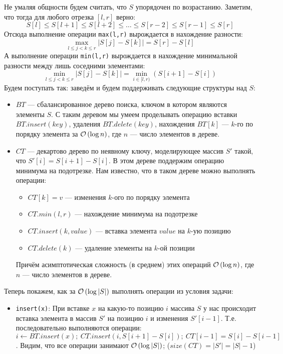 \begin{solution}
Не умаляя общности будем считать, что $S$ упорядочен по возрастанию.
Заметим, что тогда для любого отрезка $[l, r]$ верно:
\[
	S[l] \leqslant S[l + 1] \leqslant S[l + 2] \leqslant \ldots \leqslant S[r - 2] \leqslant S[r - 1] \leqslant S[r]
\]
Отсюда выполнение операции \texttt{max(l,r)} вырождается в нахождение разности:
\[
	\max_{l \leqslant j < k \leqslant r}{|S[j]-S[k]|} = S[r] - S[l]
\]
А выполнение операции \texttt{min(l,r)} вырождается в нахождение минимальной разности между лишь соседними элементами:
\[
	\min_{l \leqslant j < k \leqslant r}{|S[j]-S[k]|} = \min_{i \in [l, r)}{(S[i+1]-S[i])}
\]
Будем поступать так: заведём и будем поддерживать следующие структуры над $S$: 
\begin{itemize}
	\item $BT$ --- сбалансированное дерево поиска, ключом в котором являются элементы $S$. С таким деревом мы умеем проделывать операцию вставки $BT.insert(key)$, удаления $BT.delete(key)$, нахождения $BT[k]$ --- $k$-го по порядку элемента за $\mathcal{O}\left(\log{n}\right)$, где $n$ --- число элементов в дереве.
	\item $CT$ --- декартово дерево по неявному ключу, моделирующее массив $S'$ такой, что $S'[i] = S[i + 1] - S[i]$. В этом дереве поддержим операцию минимума на подотрезке. Нам известно, что в таком дереве можно выполнять операции:
		\begin{itemize}
			\item $CT[k] = v$ --- изменения $k$-ого по порядку элемента
			\item $CT.min(l, r)$ --- нахождение минимума на подотрезке
			\item $CT.insert(k, value)$ --- вставка элемента $value$ на $k$-ую позицию
			\item $CT.delete(k)$ --- удаление элементы на $k$-ой позиции
		\end{itemize}
	Причём асимптотическая сложность (в среднем) этих операций $\mathcal{O}\left(\log{n}\right)$, где $n$ --- число элементов в дереве.
\end{itemize}
Теперь покажем, как за $\mathcal{O}\left(\log{|S|}\right)$ выполнять операции из условия задачи:
\begin{itemize}
	\item \texttt{insert(x)}: При вставке $x$ на какую-то позицию $i$ массива $S$ у нас происходит вставка элемента в массив $S'$ на позицию $i$ и изменения $S'[i - 1]$. Т.е. последовательно выполняются операции: $i \leftarrow BT.insert(x);\ CT.insert(i, S[i + 1] - S[i]);\ CT[i - 1] = S[i] - S[i - 1]$. Видим, что все операции занимают $\mathcal{O}\left(\log{|S|}\right)$; ($size(CT) = |S'| = |S| - 1$)

\end{itemize}
\end{solution}

